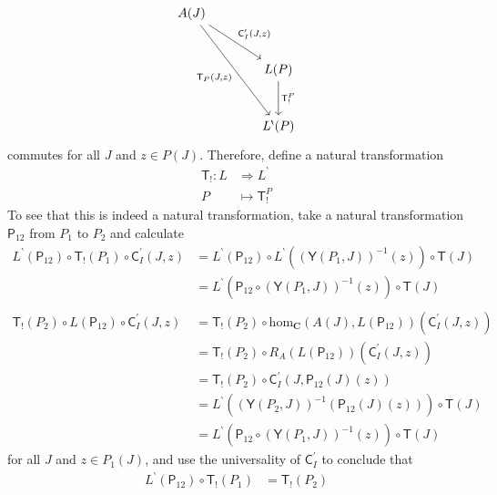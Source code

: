 \begin{prf}
\[\begin{tikzcd}[sep=large]
  A(J)
  \arrow{dr}{\mathsf{C}_{I}^{\prime}(J,z)}
  \arrow[swap]{ddr}{\mathsf{T}_{P}(J,z)}
  &
  \\
  &
  L(P)
  \arrow{d}{\mathsf{T}_{!}^{P}}
  \\
  &
  L^{\backprime}(P)
\end{tikzcd}
\]
commutes for all $J$ and $z \in P(J)$.
Therefore, define a natural transformation
\begin{align*}
  \mathsf{T}_{!}
  \colon
  L
  &\Rightarrow
  L^{\backprime}
  \\
  P
  &\mapsto
  \mathsf{T}_{!}^{P}
\end{align*}
To see that this is indeed a natural transformation, take a natural transformation $\mathsf{P}_{12}$ from $P_{1}$ to $P_{2}$ and calculate
\begin{align*}
  L^{\backprime}(\mathsf{P}_{12})
  \circ
  \mathsf{T}_{!}(P_{1})
  \circ
  \mathsf{C}_{I}^{\prime}(J,z)
  &=
  L^{\backprime}(\mathsf{P}_{12})
  \circ
  L^{\backprime}
  \left(
    (\mathsf{Y}(P_{1},J))^{-1}(z)
  \right)
  \circ
  \mathsf{T}(J)
  \\
  &=
  L^{\backprime}
  \left(
    \mathsf{P}_{12}
    \circ
    (\mathsf{Y}(P_{1},J))^{-1}(z)
  \right)
  \circ
  \mathsf{T}(J)
  \\\\
  \mathsf{T}_{!}(P_{2})
  \circ
  L(\mathsf{P}_{12})
  \circ
  \mathsf{C}_{I}^{\prime}(J,z)
  &=
  \mathsf{T}_{!}(P_{2})
  \circ
  \mathrm{hom}_{\mathbf{C}}
  \left(
    A(J),
    L(\mathsf{P}_{12})
  \right)
  \left(
    \mathsf{C}_{I}^{\prime}(J,z)
  \right)
  \\
  &=
  \mathsf{T}_{!}(P_{2})
  \circ
  R_{A}
  \left(
    L(\mathsf{P}_{12})
  \right)
  \left(
    \mathsf{C}_{I}^{\prime}(J,z)
  \right)
  \\
  &=
  \mathsf{T}_{!}(P_{2})
  \circ
  \mathsf{C}_{I}^{\prime}
  \left(
    J,
    \mathsf{P}_{12}(J)(z)
  \right)
  \\
  &=
  L^{\backprime}
  \left(
    (\mathsf{Y}(P_{2},J))^{-1}(\mathsf{P}_{12}(J)(z))
  \right)
  \circ
  \mathsf{T}(J)
  \\
  &=
  L^{\backprime}
  \left(
    \mathsf{P}_{12}
    \circ
    (\mathsf{Y}(P_{1},J))^{-1}(z)
  \right)
  \circ
  \mathsf{T}(J)
  \tag{NT}
\end{align*}
for all $J$ and $z \in P_{1}(J)$, and use the universality of $\mathsf{C}_{I}^{\prime}$ to conclude that
\begin{align*}
  L^{\backprime}(\mathsf{P}_{12})
  \circ
  \mathsf{T}_{!}(P_{1})
  &=
  \mathsf{T}_{!}(P_{2})

\end{align*}
\end{prf}
